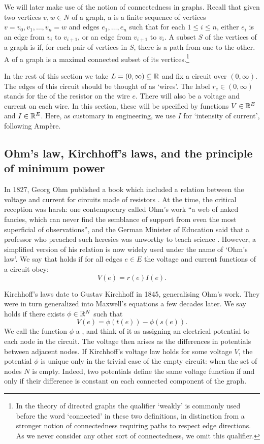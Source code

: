We will later make use of the notion of connectedness in graphs. Recall that
given two vertices $v, w \in N$ of a graph, a  is a
finite sequence of vertices $v = v_0, v_1, \dots , v_n = w$ and edges $e_1,
\dots , e_n$ such that for each $1 \le i \le n$, either $e_i$ is an edge from
$v_i$ to $v_{i+1}$, or an edge from $v_{i+1}$ to $v_i$. A subset $S$ of the
vertices of a graph is  if, for each pair of vertices in $S$,
there is a path from one to the other. A  of a graph
is a maximal connected subset of its vertices.\footnote{In the theory of
directed graphs the qualifier `weakly' is commonly used before the word
`connected' in these two definitions, in distinction from a stronger notion of
connectedness requiring paths to respect edge directions. As we never consider
any other sort of connectedness, we omit this qualifier.}

In the rest of this section we take $L = (0,\infty) \subseteq {\mathbb{R}}$ and fix a circuit over 
$(0,\infty)$.  The edges of this circuit should be thought of as `wires'.  The label 
$r_e \in (0,\infty)$ stands for the  of the resistor on the wire $e$.   
There will also be a voltage and current on each wire.  In this section, these will
be specified by functions $V \in {\mathbb{R}}^E$ and $I \in {\mathbb{R}}^E$.  Here, as customary in
engineering, we use $I$ for `intensity of current', following Amp\`ere.  

\subsection{Ohm's law, Kirchhoff's laws, and the principle of minimum power}

In 1827, Georg Ohm published a book which included a relation between the voltage
and current for circuits made of resistors \cite{O}.  At the time, the critical
reception was harsh: one contemporary called Ohm's work ``a web of naked
fancies, which can never find the semblance of support from even the most
superficial of observations'', and the German Minister of Education said that a
professor who preached such heresies was unworthy to teach science \cite{D,H}.
However, a simplified version of his relation is now widely used under the name
of `Ohm's law'. We say that  holds if for all edges $e \in
E$ the voltage and current functions of a circuit obey:
\[ 
V(e) = r(e) I(e).  \label{ohm}  
\]

Kirchhoff's laws date to Gustav Kirchhoff in 1845, generalising Ohm's work. They
were in turn generalized into Maxwell's equations a few decades later. We say
 holds if there exists $\phi \in {\mathbb{R}}^N$ such that
\[
V(e) = \phi(t(e)) - \phi(s(e)).
\]
We call the function $\phi$ a , and think of it as assigning
an electrical potential to each node in the circuit. The voltage then arises as
the differences in potentials between adjacent nodes. If Kirchhoff's voltage law
holds for some voltage $V$, the potential $\phi$ is unique only in the trivial
case of the empty circuit: when the set of nodes $N$ is empty. Indeed, two
potentials define the same voltage function if and only if their difference is
constant on each connected component of the graph.

